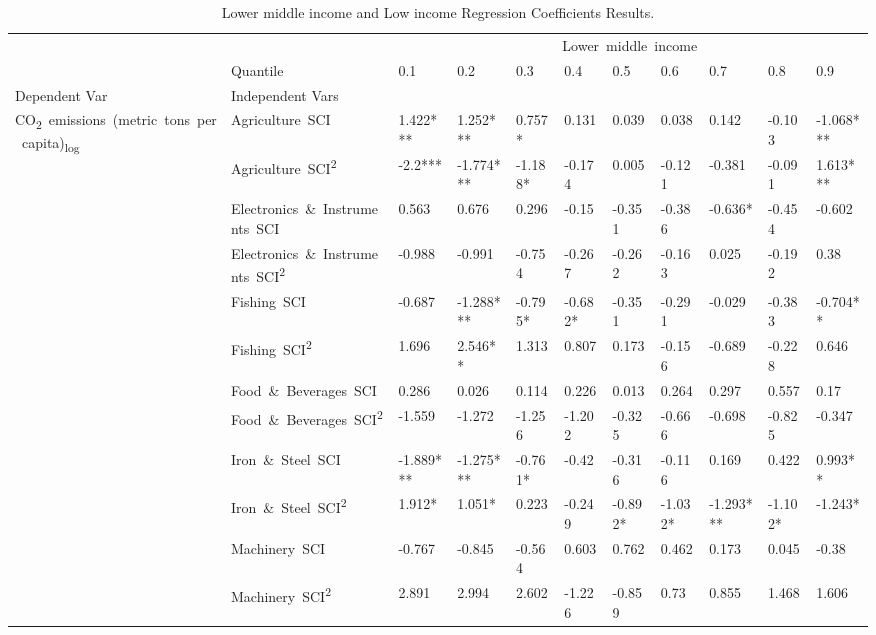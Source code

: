 \documentclass[10pt]{article}
\begin{document}
\begin{table}[H]
	\centering
	\caption{Lower middle income and Low income Regression Coefficients Results.}
\begin{adjustbox}{width=\textwidth,center}
      \begin{tabular}{lllllllllll}
      \toprule
       &  & \multicolumn{9}{c}{Lower\ middle\ income} \\
       & Quantile & 0.1 & 0.2 & 0.3 & 0.4 & 0.5 & 0.6 & 0.7 & 0.8 & 0.9 \\
      Dependent Var & Independent Vars &  &  &  &  &  &  &  &  &  \\
      \midrule
      \multirow[t]{31}{*}{CO\textsubscript{2}\ emissions\ (metric\ tons\ per\ capita)\textsubscript{log}} & Agriculture\ SCI & 1.422*** & 1.252*** & 0.757* & 0.131 & 0.039 & 0.038 & 0.142 & -0.103 & -1.068*** \\
      & Agriculture\ SCI\textsuperscript{2} & -2.2*** & -1.774*** & -1.188* & -0.174 & 0.005 & -0.121 & -0.381 & -0.091 & 1.613*** \\
      & Electronics\ \&\ Instruments\ SCI & 0.563 & 0.676 & 0.296 & -0.15 & -0.351 & -0.386 & -0.636* & -0.454 & -0.602 \\
      & Electronics\ \&\ Instruments\ SCI\textsuperscript{2} & -0.988 & -0.991 & -0.754 & -0.267 & -0.262 & -0.163 & 0.025 & -0.192 & 0.38 \\
      & Fishing\ SCI & -0.687 & -1.288*** & -0.795* & -0.682* & -0.351 & -0.291 & -0.029 & -0.383 & -0.704** \\
      & Fishing\ SCI\textsuperscript{2} & 1.696 & 2.546** & 1.313 & 0.807 & 0.173 & -0.156 & -0.689 & -0.228 & 0.646 \\
      & Food\ \&\ Beverages\ SCI & 0.286 & 0.026 & 0.114 & 0.226 & 0.013 & 0.264 & 0.297 & 0.557 & 0.17 \\
      & Food\ \&\ Beverages\ SCI\textsuperscript{2} & -1.559 & -1.272 & -1.256 & -1.202 & -0.325 & -0.666 & -0.698 & -0.825 & -0.347 \\
      & Iron\ \&\ Steel\ SCI & -1.889*** & -1.275*** & -0.761* & -0.42 & -0.316 & -0.116 & 0.169 & 0.422 & 0.993** \\
      & Iron\ \&\ Steel\ SCI\textsuperscript{2} & 1.912* & 1.051* & 0.223 & -0.249 & -0.892* & -1.032* & -1.293*** & -1.102* & -1.243* \\
      & Machinery\ SCI & -0.767 & -0.845 & -0.564 & 0.603 & 0.762 & 0.462 & 0.173 & 0.045 & -0.38 \\
      & Machinery\ SCI\textsuperscript{2} & 2.891 & 2.994 & 2.602 & -1.226 & -0.859 & 0.73 & 0.855 & 1.468 & 1.606 \\

\end{tabular}
\end{adjustbox}
\end{table}
\end{document}
